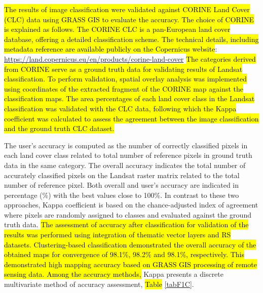 \documentclass[jimaging,article,submit,pdftex,moreauthors]{Definitions/mdpi}
\begin{document}
\hl{The results of image classification were validated against CORINE Land Cover (CLC) data using GRASS GIS to evaluate the accuracy. The choice of CORINE is explained as follows. The CORINE CLC is a pan-European land cover database, offering a detailed classification scheme. The technical details, including metadata reference are available publicly on the Copernicus website}: \href{https://land.copernicus.eu/en/products/corine-land-cover}{https://land.copernicus.eu/en/products/corine-land-cover} \hl{The categories derived from CORINE serve as a ground truth data for validating results of Landsat classification. To perform validation, spatial overlay analysis was implemented using coordinates of the extracted fragment of the CORINE map against the classification maps. The area percentages of each land cover class in the Landsat classification was validated with the CLC data, following which  the Kappa coefficient was calculated to assess the agreement between the image classification and the ground truth CLC dataset.}

The user's accuracy is computed as the number of correctly classified pixels in each land cover class related to total number of reference pixels in {ground truth} data in the same category. The overall accuracy indicates the total number of accurately classified pixels on the Landsat raster matrix related to the total number of reference pixel. Both overall and user's accuracy are indicated in percentage (\%) with the best values close to 100\%. In contrast to these two approaches, Kappa coefficient is based on the chance-adjusted index of agreement where pixels are randomly assigned to classes and evaluated against the ground truth data. \hl{The assessment of accuracy after classification for validation of the results was performed using integration of thematic vector layers and RS datasets. Clustering-based classification demonstrated the overall accuracy of the obtained maps for convergence of 98.1\%, 98.2\% and 98.1\%, respectively. This demonstrated high mapping accuracy based on GRASS GIS processing of remote sensing data. Among the accuracy methods, }Kappa presents a discrete multivariate method of accuracy assessment, \hl{Table }\ref{tabF1C}. 
\end{document}
